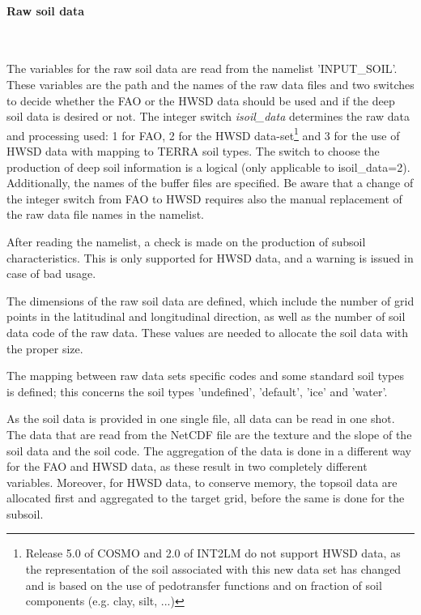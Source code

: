 \documentclass[a4paper,10pt,DIV14,BCOR1cm,titlepage,twoside]{scrartcl}
\begin{document}
\paragraph{Raw soil data}\ \par\medskip\noindent
The variables for the raw soil data are read from the namelist 'INPUT\_SOIL'. These variables are the path and the names of the raw data files and two switches to decide whether the FAO or the HWSD data should be used and if the deep soil data is desired or not. The integer switch \textit{isoil\_data} determines the raw data and processing used: 1 for FAO, 2 for the HWSD data-set\footnote{Release 5.0 of COSMO and 2.0 of INT2LM do not support HWSD data, as the representation of the soil associated with this new data set has changed and is based on the use of pedotransfer functions and on fraction of soil components (e.g. clay, silt, ...)} and 3 for the use of HWSD data with mapping to TERRA soil types. The switch to choose the production of deep soil information is a logical (only applicable to isoil\_data=2). Additionally, the names of the buffer files are specified. Be aware that a change of the integer switch from FAO to HWSD requires also the manual replacement of the raw data file  names in the namelist. \par\medskip\noindent
After reading the namelist, a check is made on the production of subsoil characteristics. This is only supported for HWSD data, and a warning is issued in case of bad usage.\par\medskip\noindent
The dimensions of the raw soil data are defined, which include the number of grid points in the latitudinal and longitudinal direction, as well as the number of soil data code of the raw data. These values are needed to allocate the soil data with the proper size. \par\medskip\noindent
The mapping between raw data sets specific codes and some standard soil types is defined; this concerns the soil types 'undefined', 'default', 'ice' and 'water'. \par\medskip\noindent
As the soil data is provided in one single file, all data can be read in one shot. The data that are read from the NetCDF file are the texture and the slope of the soil data and the soil code. The aggregation of the data is done in a different way for the FAO and HWSD data, as these result in two completely different variables. Moreover, for HWSD data, to conserve memory, the topsoil data are allocated first and aggregated to the target grid, before the same is done for the subsoil. \par\medskip\noindent
\end{document}
